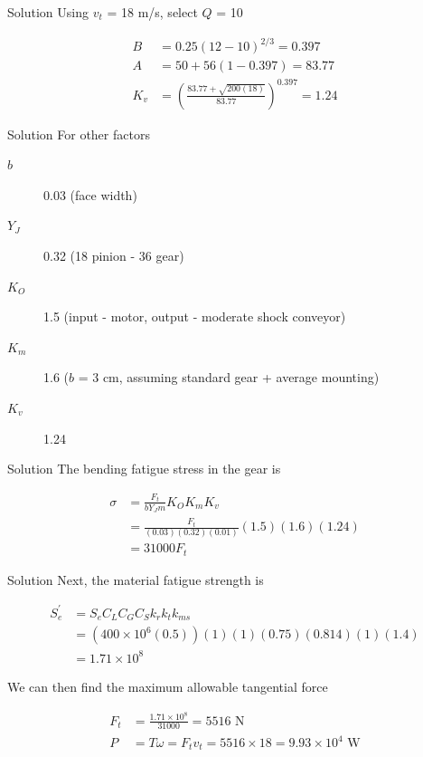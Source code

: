 \documentclass[10pt, svgnames]{beamer}
\begin{document}
\begin{frame}[label={sec:orge01dc27}]{Solution}
Using \(v_{t}\) = 18 m/s, select \(Q\) = 10

\begin{align*}
    B &= 0.25(12 - 10)^{2/3} = 0.397 \\
    A &= 50 + 56(1 - 0.397) = 83.77 \\
    K_{v} &= \left(\frac{83.77 + \sqrt{200(18)}}{83.77}\right)^{0.397} = 1.24
\end{align*}
\end{frame}

\begin{frame}[label={sec:org0aa2e82}]{Solution}
For other factors

\begin{description}
\item[{\(b\)}] 0.03 (face width)

\item[{\(Y_{J}\)}] 0.32 (18 pinion - 36 gear)

\item[{\(K_{O}\)}] 1.5 (input - motor, output - moderate shock conveyor)

\item[{\(K_{m}\)}] 1.6 (\(b\) = 3 cm, assuming standard gear + average
mounting)

\item[{\(K_{v}\)}] 1.24
\end{description}
\end{frame}

\begin{frame}[label={sec:org0217db7}]{Solution}
The bending fatigue stress in the gear is

\begin{align*}
    \sigma &= \frac{F_{t}}{bY_{J}m} K_{O}K_{m}K_{v} \\
           &= \frac{F_{t}}{(0.03)(0.32)(0.01)} (1.5)(1.6)(1.24) \\
           &= 31000 F_{t}
\end{align*}
\end{frame}

\begin{frame}[label={sec:orgeeff3ee}]{Solution}
Next, the material fatigue strength is

\begin{align*}
    S_{e}^{\prime} &= S_{e}C_{L}C_{G}C_{S}k_{r}k_{t}k_{ms} \\
                   &= (400 \times 10^{6}(0.5))(1)(1)(0.75)(0.814)(1)(1.4) \\
                   &= 1.71 \times 10^{8}
\end{align*}

We can then find the maximum allowable tangential force

\begin{align*}
    F_{t} &= \frac{1.71 \times 10^{8}}{31000} = 5516 \text{ N} \\
    P &= T \omega = F_{t} v_{t} = 5516 \times 18 = 9.93 \times 10^{4} \text{ W}
\end{align*}
\end{frame}
\end{document}
